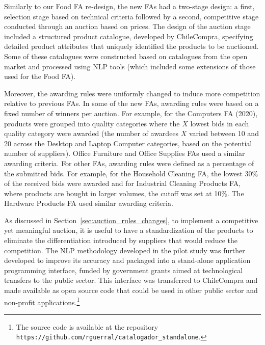 Similarly to our Food FA re-design, the new FAs had a two-stage design: a first, selection stage based on technical criteria followed by a second, competitive stage conducted through an auction based on prices. 
The design of the auction stage included a structured product catalogue, developed by ChileCompra, specifying detailed product attributes that uniquely identified the products to be auctioned. Some of these catalogues were constructed based on catalogues from the open market and processed using NLP tools (which included some extensions of those used for the Food FA). 

Moreover, the awarding rules were uniformly changed to induce more competition relative to previous FAs. 
In some of the new FAs, awarding rules were based on a fixed number of winners per auction. For example, for the Computers FA (2020), products were grouped into quality categories where the $X$ lowest bids in each quality category were awarded (the number of awardees $X$ varied between 10 and 20 across the Desktop and Laptop Computer categories, based on the potential number of suppliers). Office Furniture and Office Supplies FAs used a similar awarding criteria. For other FAs, awarding rules were defined as a percentage of the submitted bids. For example, for the Household Cleaning FA, the lowest 30\% of the received bids were awarded and  for Industrial Cleaning Products FA, where products  are bought in larger volumes, the cutoff was set at 10\%. The Hardware Products FA used similar awarding criteria.


 As discussed in Section~\ref{sec:auction_rules_changes}, to implement a competitive yet meaningful auction, it is useful to have a standardization of the products to eliminate the differentiation introduced by suppliers that would reduce the competition. The NLP methodology developed in the pilot study was further developed to improve its accuracy and packaged into a stand-alone application programming interface, funded by government grants aimed at technological transfers to the public sector. This interface was transferred to ChileCompra and made available as open source code that could be used in other public sector and non-profit applications.\footnote{The source code is available at the repository \texttt{https://github.com/rguerral/catalogador\_standalone}. }

